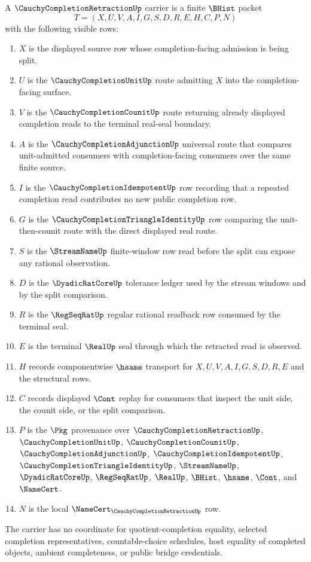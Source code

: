 \begin{definition}
\label{def:cauchy-completion-retraction-carrier}
A $\CauchyCompletionRetractionUp$ carrier is a finite $\BHist$ packet
$$
T=(X,U,V,A,I,G,S,D,R,E,H,C,P,N)
$$
with the following visible rows:
\begin{enumerate}
\item $X$ is the displayed source row whose completion-facing admission is being split.
\item $U$ is the $\CauchyCompletionUnitUp$ route admitting $X$ into the completion-facing surface.
\item $V$ is the $\CauchyCompletionCounitUp$ route returning already displayed completion reads to the terminal real-seal boundary.
\item $A$ is the $\CauchyCompletionAdjunctionUp$ universal route that compares unit-admitted consumers with completion-facing consumers over the same finite source.
\item $I$ is the $\CauchyCompletionIdempotentUp$ row recording that a repeated completion read contributes no new public completion row.
\item $G$ is the $\CauchyCompletionTriangleIdentityUp$ row comparing the unit-then-counit route with the direct displayed real route.
\item $S$ is the $\StreamNameUp$ finite-window row read before the split can expose any rational observation.
\item $D$ is the $\DyadicRatCoreUp$ tolerance ledger used by the stream windows and by the split comparison.
\item $R$ is the $\RegSeqRatUp$ regular rational readback row consumed by the terminal seal.
\item $E$ is the terminal $\RealUp$ seal through which the retracted read is observed.
\item $H$ records componentwise $\hsame$ transport for $X,U,V,A,I,G,S,D,R,E$ and the structural rows.
\item $C$ records displayed $\Cont$ replay for consumers that inspect the unit side, the counit side, or the split comparison.
\item $P$ is the $\Pkg$ provenance over $\CauchyCompletionRetractionUp$, $\CauchyCompletionUnitUp$, $\CauchyCompletionCounitUp$, $\CauchyCompletionAdjunctionUp$, $\CauchyCompletionIdempotentUp$, $\CauchyCompletionTriangleIdentityUp$, $\StreamNameUp$, $\DyadicRatCoreUp$, $\RegSeqRatUp$, $\RealUp$, $\BHist$, $\hsame$, $\Cont$, and $\NameCert$.
\item $N$ is the local $\NameCert_{\CauchyCompletionRetractionUp}$ row.
\end{enumerate}
The carrier has no coordinate for quotient-completion equality, selected completion representatives, countable-choice schedules, host equality of completed objects, ambient completeness, or public bridge credentials.
\end{definition}

